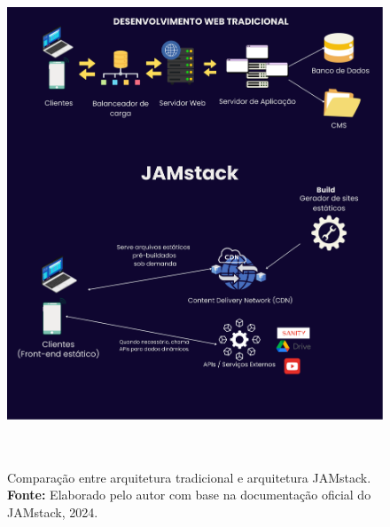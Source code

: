 {\begin{figure}[H]
    \centering
    \includegraphics[height=15cm, keepaspectratio]{img/arquitetura/JAMstack explicação.png}
    \caption{ Comparação entre arquitetura tradicional e arquitetura JAMstack. \\
        \textbf{Fonte:} Elaborado pelo autor com base na documentação oficial do JAMstack, 2024.}
    \label{fig:jamStack Arquitetura}
\end{figure}

}
